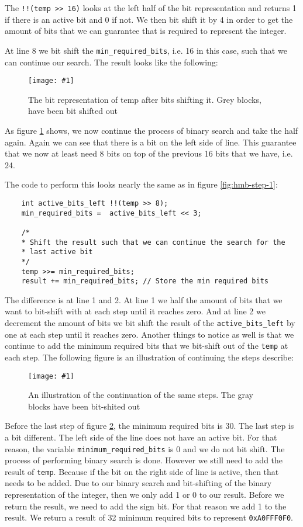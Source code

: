 \documentclass[11pt]{article}
\newcommand{\code}[1]{{\colorbox{lightgray!15}{\color{orange}\texttt{#1}}}}
\newcommand{\centeredpic}[3]{
    \begin{figure}[h]
        \texttt{[image: \#1]}
        \centering
        \caption{#2}
        \label{fig:#3}
    \end{figure}
}
\begin{document}
The \code{!!(temp >> 16)} looks at the left half of the bit representation and returns 1 if there is an active bit and 0 if not. We then bit shift it by 4 in order to get the amount of bits 
that we can guarantee that is required to represent the integer. 

At line 8 we bit shift the \code{min\_required\_bits}, i.e. 16 in this case, such that we can continue our search. The result looks like the following:
\centeredpic{howmanybits-02.png}{The bit representation of temp after bits shifting it. Grey blocks, have been bit shifted out}{hmb-step-2}

As figure \ref{fig:hmb-step-2} shows, we now continue the process of binary search and take the half again. Again we can see that there is
a bit on the left side of line. This guarantee that we now at least need 8 bits on top of the previous 16 bits that we have, i.e. 24.

The code to perform this looks nearly the same as in figure \ref{fig:hmb-step-1}:
\begin{lstlisting}
    int active_bits_left !!(temp >> 8);
    min_required_bits =  active_bits_left << 3;

    /* 
    * Shift the result such that we can continue the search for the 
    * last active bit 
    */
    temp >>= min_required_bits;
    result += min_required_bits; // Store the min required bits
\end{lstlisting}

The difference is at line 1 and 2. At line 1 we half the amount of bits that we want to bit-shift with at each step until it reaches zero. And at line 2 we decrement the 
amount of bits we bit shift the result of the \code{active\_bits\_left} by one at each step until it reaches zero. 
Another things to notice as well is that we continue to add the minimum required bits that we bit-shift out of the \code{temp} at each step.
The following figure is an illustration of continuing the steps describe: 
\centeredpic{howmanybits-03.png}{An illustration of the continuation of the same steps. The gray blocks have been bit-shited out}{hmb-step-last}

Before the last step of figure \ref{fig:hmb-step-last}, the minimum required bits is 30. The last step is a bit different. The left side of the line does not have an active bit.
For that reason, the variable \code{minimum\_required\_bits} is 0 and we do not bit shift.
The process of performing binary search is done. However we still need to add the result of \code{temp}. Because if the bit on the right side of line is active, then that needs to be added.
Due to our binary search and bit-shifting of the binary representation of the integer, then we only add 1 or 0 to our result. 
Before we return the result, we need to add the sign bit. For that reason we add 1 to the result. We return a result of 32 minimum required bits to represent \code{0xA0FFF0F0}.
\end{document}
